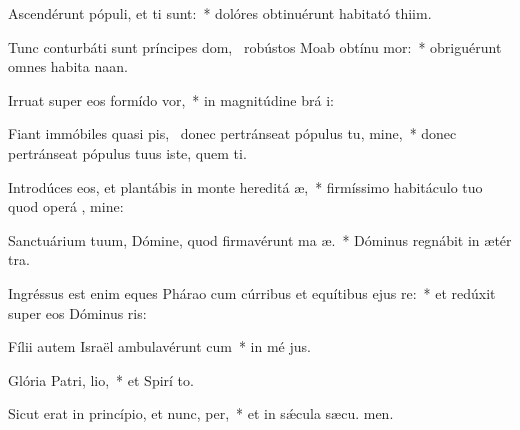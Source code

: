 \item Ascendérunt pópuli, et ti sunt:~* dolóres obtinuérunt habitató thiim.
\item Tunc conturbáti sunt príncipes dom,~\pscross{} robústos Moab obtínu mor:~* obriguérunt omnes habita naan.
\item Irruat super eos formído  vor,~* in magnitúdine brá i:
\item Fiant immóbiles quasi pis,~\pscross{} donec pertránseat pópulus tu, mine,~* donec pertránseat pópulus tuus iste, quem ti.
\item Introdúces eos, et plantábis in monte hereditá æ,~* firmíssimo habitáculo tuo quod operá , mine:
\item Sanctuárium tuum, Dómine, quod firmavérunt ma æ.~* Dóminus regnábit in ætér  tra.
\item Ingréssus est enim eques Phárao cum cúrribus et equítibus ejus  re:~* et redúxit super eos Dóminus  ris:
\item Fílii autem Israël ambulavérunt  cum~* in mé jus.
\item Glória Patri,  lio,~* et Spirí to.
\item Sicut erat in princípio, et nunc,  per,~* et in sǽcula sæcu. men.
